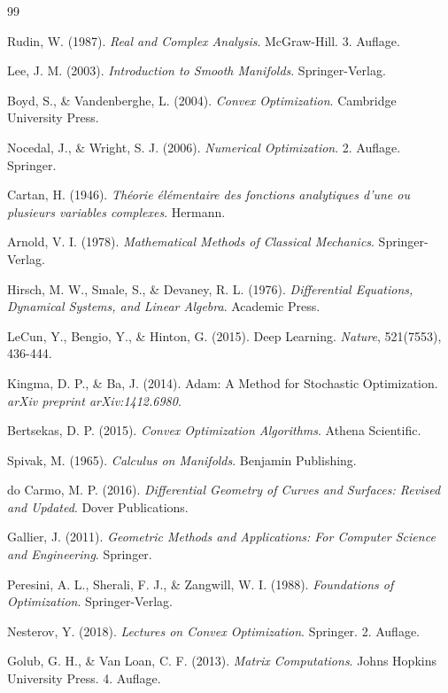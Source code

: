 ﻿\documentclass[a4paper,12pt]{article}
\theoremstyle{definition}
\begin{document}
\begin{thebibliography}{99}

Rudin, W. (1987). \textit{Real and Complex Analysis}. McGraw-Hill. 3. Auflage.

Lee, J. M. (2003). \textit{Introduction to Smooth Manifolds}. Springer-Verlag.

Boyd, S., \& Vandenberghe, L. (2004). \textit{Convex Optimization}. Cambridge University Press.

Nocedal, J., \& Wright, S. J. (2006). \textit{Numerical Optimization}. 2. Auflage. Springer.

Cartan, H. (1946). \textit{Théorie élémentaire des fonctions analytiques d'une ou plusieurs variables complexes}. Hermann.

Arnold, V. I. (1978). \textit{Mathematical Methods of Classical Mechanics}. Springer-Verlag.

Hirsch, M. W., Smale, S., \& Devaney, R. L. (1976). \textit{Differential Equations, Dynamical Systems, and Linear Algebra}. Academic Press.

LeCun, Y., Bengio, Y., \& Hinton, G. (2015). Deep Learning. \textit{Nature}, 521(7553), 436-444.

Kingma, D. P., \& Ba, J. (2014). Adam: A Method for Stochastic Optimization. \textit{arXiv preprint arXiv:1412.6980}.

Bertsekas, D. P. (2015). \textit{Convex Optimization Algorithms}. Athena Scientific.

Spivak, M. (1965). \textit{Calculus on Manifolds}. Benjamin Publishing.

do Carmo, M. P. (2016). \textit{Differential Geometry of Curves and Surfaces: Revised and Updated}. Dover Publications.

Gallier, J. (2011). \textit{Geometric Methods and Applications: For Computer Science and Engineering}. Springer.

Peresini, A. L., Sherali, F. J., \& Zangwill, W. I. (1988). \textit{Foundations of Optimization}. Springer-Verlag.

Nesterov, Y. (2018). \textit{Lectures on Convex Optimization}. Springer. 2. Auflage.

Golub, G. H., \& Van Loan, C. F. (2013). \textit{Matrix Computations}. Johns Hopkins University Press. 4. Auflage.


\end{thebibliography}
\end{document}
